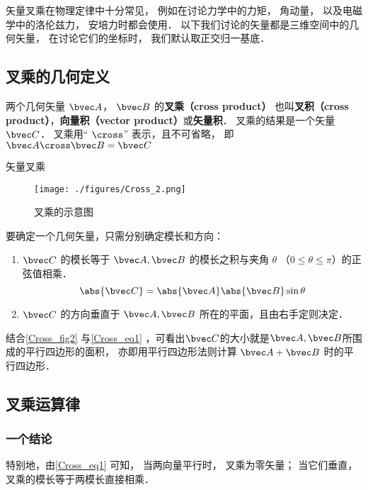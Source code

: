 

矢量叉乘在物理定律中十分常见， 例如在讨论力学中的力矩， 角动量， 以及电磁学中的洛伦兹力， 安培力时都会使用． 以下我们讨论的矢量都是三维空间中的几何矢量， 在讨论它们的坐标时， 我们默认取正交归一基底．

\subsection{叉乘的几何定义}
两个几何矢量 $\bvec A$，  $\bvec B$ 的\textbf{叉乘（cross product）} 也叫\textbf{叉积（cross product）}，\textbf{向量积（vector product）}或\textbf{矢量积}． 叉乘的结果是一个矢量 $\bvec C$．  叉乘用“ $\cross$” 表示，且不可省略， 即 $ \bvec A \cross \bvec B = \bvec C$

\begin{definition}{矢量叉乘}\label{Cross_def1}

\begin{figure}[ht]
\centering
\texttt{[image: ./figures/Cross\_2.png]}
\caption{叉乘的示意图} \label{Cross_fig2}
\end{figure}

要确定一个几何矢量，只需分别确定模长和方向：
\begin{enumerate}
\item $\bvec C$ 的模长等于 $\bvec A, \bvec B$ 的模长之积与夹角 $\theta$ （$0 \leqslant \theta \leqslant \pi$）的正弦值相乘．
\begin{equation}\label{Cross_eq1}
\abs{\bvec C}  = \abs{\bvec A} \abs{\bvec B} \sin\theta 
\end{equation}
\item $\bvec C$ 的方向垂直于 $\bvec A, \bvec B$ 所在的平面，且由右手定则决定．
\end{enumerate}
\end{definition}

结合\autoref{Cross_fig2} 与\autoref{Cross_eq1} ，可看出$\bvec C$的大小就是$\bvec A, \bvec B$所围成的平行四边形的面积， 亦即用平行四边形法则计算 $\bvec A + \bvec B$ 时的平行四边形．

\subsection{叉乘运算律}
\subsubsection{一个结论}
特别地，由\autoref{Cross_eq1} 可知， 当两向量平行时， 叉乘为零矢量； 当它们垂直， 叉乘的模长等于两模长直接相乘．%

